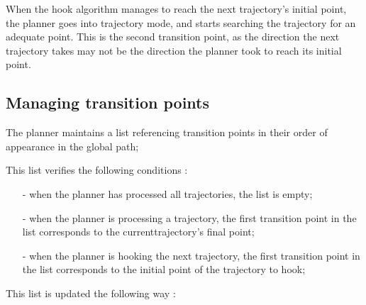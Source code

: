 When the hook algorithm manages to reach the next trajectory's initial point, the planner goes into 
trajectory mode, and starts searching the trajectory for an adequate point.
This is the second transition point, as the direction the next trajectory takes may not be the direction 
the planner took to reach its initial point.
\newline


\subsection{Managing transition points}

The planner maintains a list referencing transition points in their order of appearance in the global 
path;
\newline

This list verifies the following conditions :
\begin{itemize}

\item[-] when the planner has processed all trajectories, the list is empty;

\item[-] when the planner is processing a trajectory, the first transition point in the list corresponds to 
the currenttrajectory's final point;

\item[-] when the planner is hooking the next trajectory, the first transition point in the list corresponds
to the initial point of the trajectory to hook;

\end{itemize}

This list is updated the following way :

